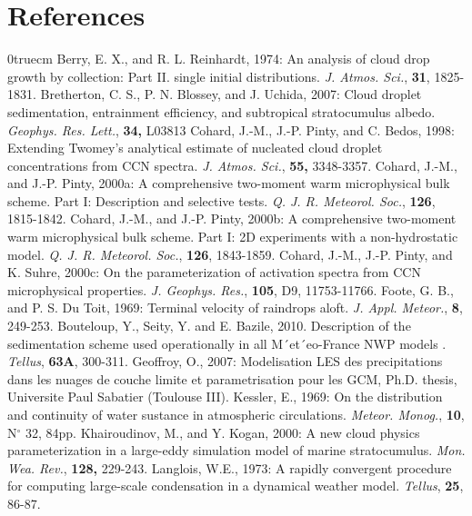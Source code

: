 \section{References}
\parindent 0truecm
\por
Berry, E. X., and R. L. Reinhardt, 1974: An analysis of cloud drop growth by
        collection: Part II. single initial distributions.
        {\it J. Atmos. Sci.},
        {\bf 31},
        1825-1831.
\por
Bretherton, C. S., P. N. Blossey, and J. Uchida, 2007: Cloud droplet sedimentation, entrainment efficiency,
           and subtropical stratocumulus albedo.
           {\it Geophys. Res. Lett.},
           {\bf 34,} 
           L03813
\por
Cohard, J.-M., J.-P. Pinty, and C. Bedos, 1998: Extending Twomey's analytical
        estimate of nucleated cloud droplet concentrations from CCN spectra.
        {\it J. Atmos. Sci.},
        {\bf 55,}
        3348-3357.
\por
Cohard, J.-M., and J.-P. Pinty, 2000a: A comprehensive two-moment warm
        microphysical bulk scheme. Part I: Description and selective tests.
        {\it Q. J. R. Meteorol. Soc.},
        {\bf 126},
        1815-1842.
\por
Cohard, J.-M., and J.-P. Pinty, 2000b: A comprehensive two-moment warm
        microphysical bulk scheme. Part I: 2D experiments with a
        non-hydrostatic model.
        {\it Q. J. R. Meteorol. Soc.},
        {\bf 126},
        1843-1859.
\por
Cohard, J.-M., J.-P. Pinty, and K. Suhre, 2000c: On the parameterization of
        activation spectra from CCN microphysical properties.
        {\it J. Geophys.  Res.},
        {\bf 105},
        D9,
        11753-11766.
\por
Foote, G. B., and P. S. Du Toit, 1969: Terminal velocity of raindrops aloft.
{\it J. Appl. Meteor.}, {\bf 8}, 249-253.
\por
Bouteloup, Y., Seity, Y. and E. Bazile, 2010. Description of the sedimentation scheme used operationally in all M´et´eo-France NWP models .
        {\it Tellus},
        {\bf 63A},
        300-311.
\por
Geoffroy, O., 2007: Modelisation LES des precipitations dans les nuages de couche limite et parametrisation pour les GCM, Ph.D. thesis, Universite Paul Sabatier (Toulouse III).
\por
Kessler, E., 1969: On the distribution and continuity of water sustance in
atmospheric circulations. {\it Meteor. Monog.}, {\bf 10}, N$^\circ$ 32, 84pp.
\por
Khairoudinov, M., and Y. Kogan, 2000: A new cloud physics parameterization
        in a large-eddy simulation model of marine stratocumulus.
        {\it Mon. Wea. Rev.},
        {\bf 128,}
        229-243.
\por
Langlois, W.E., 1973: A rapidly convergent procedure for computing large-scale
condensation in a dynamical weather model. {\it Tellus}, {\bf 25}, 86-87.
